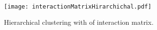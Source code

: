 \documentclass{article}
\begin{document}
\begin{figure}[ht]
	\begin{center}
		\texttt{[image: interactionMatrixHirarchichal.pdf]}
	\end{center}
	\caption{Hierarchical clustering with of interaction matrix.}
	\label{fig:intMH}
\end{figure}


\end{document}
